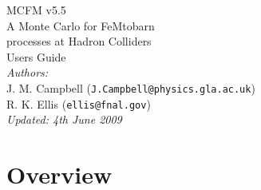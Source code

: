 \documentclass[12pt]{article}
\begin{document}
\def\GeV{\mbox{GeV}}
\def\cteqsixsixm{\mbox{0802.0007 [hep-ph]}}
\def\cteqsixonem{\mbox{hep-ph/0303013}}
\def\cteqsix{\mbox{hep-ph/0201195}}
\def\cteqfive{\mbox{hep-ph/9903282}}
\def\cteqfour{\mbox{hep-ph/9606399}}
\def\cteqthree{\mbox{MSU-HEP/41024}}
\def\mrstff{\mbox{hep-ph/0603143}}
\def\mrstohtwo{\mbox{hep-ph/0211080}}
\def\mrstohone{\mbox{hep-ph/0110215}}
\def\mrsninenine{\mbox{hep-ph/9907231}}
\def\mrsnineeight{\mbox{hep-ph/9803445}}
\def\mrsninesix{\mbox{PLB387 (1996) 419}}
\def\mrsninefive{\mbox{PLB354 (1995) 155}}
\def\hmrs{\mbox{Durham DTP-90-04}}
\def\mstwoheight{\mbox{0901.0002 [hep-ph]}}

\thispagestyle{empty}
\vspace*{3cm}
\begin{center}
{\Huge MCFM v5.5} \\
\vspace*{0.5cm}
\Large{A Monte Carlo for FeMtobarn} \\
\Large{processes at Hadron Colliders} \\
\vspace*{2cm}
{\huge Users Guide} \\
\vspace*{4cm}
{\it Authors:} \\
\vspace*{0.2cm}
J. M. Campbell ({\tt J.Campbell@physics.gla.ac.uk}) \\
R. K. Ellis ({\tt ellis@fnal.gov}) \\
\vspace*{2.5cm}
{\it \small Updated: 4th June 2009}
\end{center}

\newpage

\tableofcontents

\section{Overview}
\end{document}
